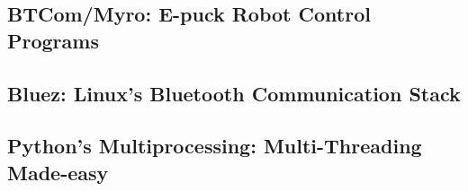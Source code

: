 \subsection{BTCom/Myro: E-puck Robot Control Programs}
\label{expt-tools:epuck-sw}
\subsection{Bluez: Linux's Bluetooth Communication Stack}
\label{expt-tools:bluez}
\subsection{Python's Multiprocessing: Multi-Threading Made-easy}
\label{expt-tools:python}
